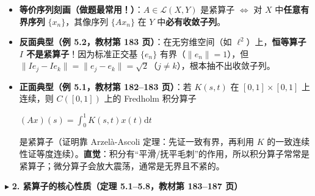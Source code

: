 \documentclass[11pt,a4paper]{article}
\providecommand{\tightlist}{\setlength{\itemsep}{2pt}\setlength{\parskip}{0pt}}
\newcommand{\SubSubHeading}[1]{%
  \Needspace{6.5\baselineskip}\vspace{5.5pt}\noindent
  \textcolor{AccentMain}{\scriptsize$\blacktriangleright$}\hspace{4pt}%
  {\small\bfseries\color{AccentMain}#1}\par\nopagebreak[4]\vspace{2.5pt}%
}
\newcommand{\FitDisplayMath}[1]{%
  \par\vspace{4.5pt}\noindent
  \begin{adjustbox}{max width=\linewidth, center}
    $\displaystyle #1$
  \end{adjustbox}
  \par\vspace{4.5pt}%
}
\begin{document}
\begin{itemize}
\tightlist
\item
  \textbf{等价序列刻画（做题最常用！）}：\(A \in \mathcal{L}(X, Y)\) 是紧算子 \(\iff\) 对 \(X\) 中\textbf{任意有界序列} \(\{x_n\}\)，其像序列 \(\{Ax_n\}\) 在 \(Y\) 中\textbf{必有收敛子列}。
\item
  \textbf{反面典型（例 5.2，教材第 183 页）}：在无穷维空间（如 \(\ell^2\)）上，\textbf{恒等算子 \(I\) 不是紧算子}！因为标准正交基 \(\{e_n\}\) 有界（\(\|e_n\|=1\)），但 \(\|Ie_j - Ie_k\| = \|e_j - e_k\| = \sqrt{2}\)（\(j \neq k\)），根本抽不出收敛子列。
\item
  \textbf{正面典型（例 5.1，教材第 182--183 页）}：若 \(K(s, t)\) 在 \([0,1] \times [0,1]\) 上连续，则 \(C([0,1])\) 上的 Fredholm 积分算子 
\FitDisplayMath{(Ax)(s) = \int_0^1 K(s, t) x(t) \mathrm{d}t}
 是紧算子（证明靠 Arzelà-Ascoli 定理：先证一致有界，再利用 \(K\) 的一致连续性证等度连续）。\textbf{直觉}：积分有``平滑/抚平毛刺''的作用，所以积分算子常常是紧算子；微分算子会放大震荡，通常是无界且不紧的。
\end{itemize}

\SubSubHeading{2. 紧算子的核心性质（定理 5.1--5.8，教材第 183--187 页）}
\end{document}
